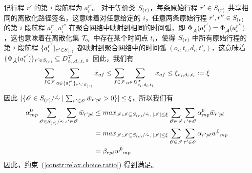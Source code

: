 记行程 $r'$ 的第 $i$ 段航程为 $a_i^{r'}$。
对于等价类 $S_{(r)}$，每条原始行程 $r' \in S_{(r)}$ 共享相同的离散化路径签名，这意味着对任意给定的 $i$，任意两条原始行程 $r', r'' \in S_{(r)}$ 的第 $i$ 段航程 $a_i^{r'}, a_i^{r''}$ 在聚合网络中映射到相同的时间弧，即 $\Phi_{\hat{\mathcal{A}}}(a_i^{r'}) = \Phi_{\hat{\mathcal{A}}}(a_i^{r''})$，这也意味着在离散化集 $\mathcal{T}_{o_i}$ 中存在某个时间点 $t_i$，使得 $S_{(r)}$ 中所有原始行程的第 $i$ 段航程 $\{a_i^{r'}\}_{r'\in S_{(r)}}$ 都映射到聚合网络中的时间弧 $(o_i, t_i, d_i, t'_i)$，这意味着 $\{\Phi_{\hat{\mathcal{A}}}(a_i^{r'})\}_{r'\in S_{(r)}}\subseteq D_{o_i,d_i,t_i}^{\mathcal{T}}$。因此，我们有
\[
    \sum_{f\in\mathcal{F}}\sum_{a\in\{a_i^{r'}\}_{r'\in S_{(r)}}} \bar{x}_{af}
    \le \sum_{f\in\mathcal{F}}\sum_{a\in D_{o_i,d_i,t_i}^{\mathcal{T}}} x_{af}
    \le \xi_{o_i,d_i,t_i} := \xi
\]
因此 $|\{\mathscr{O} \in S_{(r)}/\hat{\sim}\mid \sum_{r' \in \mathscr{O}} \bar{w}_{r'p\ell} > 0\}| \le \xi$，所以我们有
\begin{equation*}
\begin{aligned}
    \alpha^0_{mp} \sum_{\mathscr{O} \in S_{(r)}/\hat{\sim}} \sum_{r' \in \mathscr{O}} \bar{w}_{r'p\ell}
    & \le max_{\mathscr{I}: \mathscr{I} \subseteq S_{(r)} /\hat{\sim},\; |\mathscr{I}| \le \xi} \sum_{\mathscr{O} \in \mathscr{I}} \sum_{r' \in \mathscr{O}} \alpha^0_{mp} \bar{w}_{r'p\ell} \\
    & = max_{\mathscr{I}: \mathscr{I} \subseteq S_{(r)} /\hat{\sim},\; |\mathscr{I}| \le \xi} \sum_{\mathscr{O} \in \mathscr{I}} \sum_{r' \in \mathscr{O}} \alpha_{r'p\ell} {w^0}_{mp} \\
    & = \beta_{rp\ell} {w^0}_{mp}
\end{aligned}
\end{equation*}
因此，约束~(\ref{constr:relax.choice.ratio}) 得到满足。
